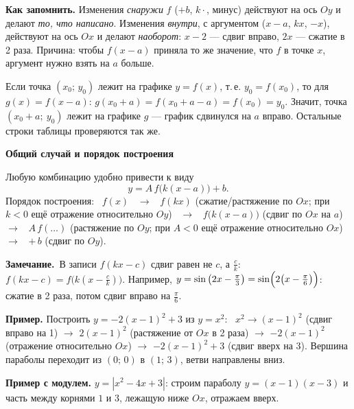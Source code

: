 \documentclass[a4paper,11pt]{article}
\newcommand{\zam}{\par\smallskip\noindent\textbf{\textcolor{zamc}{Замечание.}}\ }
\newcommand{\podr}[1]{\par\needspace{8\baselineskip}\medskip
  {\large\bfseries\textcolor{oprc!80!black}{#1}}\par\nopagebreak\smallskip}
\begin{document}
\textbf{Как запомнить.} Изменения \emph{снаружи} $f$ ($+b$, $k\cdot$, минус) действуют на ось $Oy$ и делают \emph{то, что написано}.
Изменения \emph{внутри}, с аргументом ($x - a$, $kx$, $-x$), действуют на ось $Ox$ и делают \emph{наоборот}:
$x - 2$ --- сдвиг вправо, $2x$ --- сжатие в 2 раза. Причина: чтобы $f(x - a)$ приняла то же значение, что $f$ в точке $x$,
аргумент нужно взять на $a$ больше.

\begin{dop}
Если точка $(x_0;\, y_0)$ лежит на графике $y = f(x)$, т.\,е. $y_0 = f(x_0)$, то для $g(x) = f(x - a)$:
$g(x_0 + a) = f(x_0 + a - a) = f(x_0) = y_0$. Значит, точка $(x_0 + a;\ y_0)$ лежит на графике $g$ --- график сдвинулся на $a$ вправо.
Остальные строки таблицы проверяются так же.
\end{dop}

\podr{Общий случай и порядок построения}

Любую комбинацию удобно привести к виду
\[
  y = A\, f\bigl(k(x - a)\bigr) + b .
\]
Порядок построения: \ $f(x)$ \ $\to$ \ $f(kx)$ (сжатие/растяжение по $Ox$; при $k < 0$ ещё отражение относительно $Oy$) \
$\to$ \ $f\bigl(k(x - a)\bigr)$ (сдвиг по $Ox$ на $a$) \ $\to$ \ $A\,f(\dots)$ (растяжение по $Oy$; при $A < 0$ ещё отражение
относительно $Ox$) \ $\to$ \ $+\,b$ (сдвиг по $Oy$).

\nopagebreak
\zam В записи $f(kx - c)$ сдвиг равен не $c$, а $\frac{c}{k}$: \ $f(kx - c) = f\bigl(k(x - \frac{c}{k})\bigr)$.
Например, $y = \sin\left(2x - \frac\pi3\right) = \sin\Bigl(2\bigl(x - \frac\pi6\bigr)\Bigr)$: сжатие в 2 раза, потом сдвиг вправо на $\frac\pi6$.

\textbf{Пример.} Построить $y = -2(x - 1)^2 + 3$ из $y = x^2$: \ $x^2 \to (x - 1)^2$ (сдвиг вправо на 1) $\to$ $2(x - 1)^2$
(растяжение от $Ox$ в 2 раза) $\to$ $-2(x - 1)^2$ (отражение относительно $Ox$) $\to$ $-2(x - 1)^2 + 3$ (сдвиг вверх на 3).
Вершина параболы переходит из $(0;\, 0)$ в $(1;\, 3)$, ветви направлены вниз.

\textbf{Пример с модулем.} $y = |x^2 - 4x + 3|$: строим параболу $y = (x - 1)(x - 3)$ и часть между корнями $1$ и $3$,
лежащую ниже $Ox$, отражаем вверх.
\end{document}
